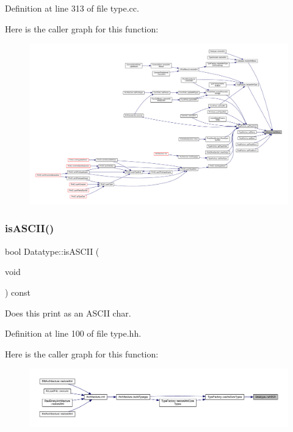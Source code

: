 Definition at line 313 of file type.\+cc.

Here is the caller graph for this function\+:
\nopagebreak
\begin{figure}[H]
\begin{center}
\leavevmode
\includegraphics[width=350pt]{class_datatype_a4733a0e51a359ad324583d06824b5b92_icgraph}
\end{center}
\end{figure}
\mbox{\label{class_datatype_a6f3de8c7f2381dde345f5993ae83ebb5}} 
\subsubsection{\texorpdfstring{isASCII()}{isASCII()}}
{\footnotesize\ttfamily bool Datatype\+::is\+A\+S\+C\+II (\begin{DoxyParamCaption}\item[{void}]{ }\end{DoxyParamCaption}) const\hspace{0.3cm}{\ttfamily [inline]}}



Does this print as an A\+S\+C\+II \textquotesingle{}char\textquotesingle{}. 



Definition at line 100 of file type.\+hh.

Here is the caller graph for this function\+:
\nopagebreak
\begin{figure}[H]
\begin{center}
\leavevmode
\includegraphics[width=350pt]{class_datatype_a6f3de8c7f2381dde345f5993ae83ebb5_icgraph}
\end{center}
\end{figure}
\mbox{\label{class_datatype_a9d1f2c6f358067cce0fea04e9a55a757}} 
